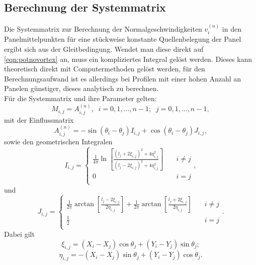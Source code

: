 \subsection{Berechnung der Systemmatrix}
\label{chap:systemmatrixtheory}
Die Systemmatrix zur Berechnung der Normalgeschwindigkeiten $v_i^{(n)}$ in den Panelmittelpunkten für eine stückweise konstante Quellenbelegung der Panel ergibt sich aus der Gleitbedingung. Wendet man diese direkt auf \eqref{eqn:potnovortex} an, muss ein kompliziertes Integral gelöst werden. Dieses kann theoretisch direkt mit Computermethoden gelöst werden, für den Berechnungsaufwand ist es allerdings bei Profilen mit einer hohen Anzahl an Panelen günstiger, dieses analytisch zu berechnen. \\
Für die Systemmatrix und ihre Parameter gelten:
\begin{equation}
\label{eq:mnovortex}
M_{i,j} = A_{i,j}^{(n)}, \;\; i = 0, 1, \ldots , n-1; \;\; j = 0,1,\ldots , n-1,
\end{equation}
mit der Einflussmatrix
\begin{equation}
\label{eq:An}
A_{i,j}^{(n)} = -\sin {(\theta _i - \theta _j)} I_{i,j} + \cos{(\theta _i - \theta _j)} J_{i,j},
\end{equation}
sowie den geometrischen Integralen
\begin{equation}
I_{i,j} = 
     \begin{cases}
       \frac{1}{4\pi } \ln \left[ \frac{(l_j + 2 \xi_{i,j})^2 + 4 \eta_{i,j}^2}{(l_j -2 \xi _{i,j})^2 + 4 \eta_{i,j}^2} \right] &\quad i \neq j \\
       0 &\quad i = j \\
     \end{cases},
\end{equation}
und
\begin{equation}
J_{i,j} = 
     \begin{cases}
       \frac{1}{2\pi } \arctan \left[ \frac{l_j - 2 \xi_{i,j}}{2 \eta_{i,j}} \right] + \frac{1}{2\pi } \arctan \left[ \frac{l_j + 2 \xi_{i,j}}{2 \eta_{i,j}} \right] &\quad i \neq j \\
       \frac{1}{2} &\quad i = j \\
     \end{cases}.
\end{equation}
Dabei gilt
\begin{equation}
\label{eq:xi}
\xi_{i,j} =  (X_i - X_j) \cos \theta _j + (Y_i - Y_j) \sin \theta _j;
\end{equation}
\begin{equation}
\label{eq:eta}
\eta_{i,j} =  -(X_i - X_j) \sin \theta _j + (Y_i - Y_j) \cos \theta _j.
\end{equation}
